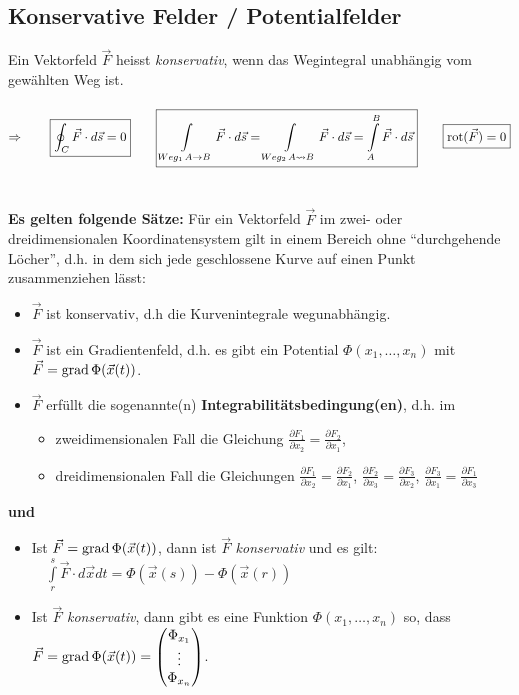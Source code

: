 \subsection{Konservative Felder / Potentialfelder}
Ein Vektorfeld $\vec{F}$ heisst \textit{konservativ}, wenn das Wegintegral
unabhängig vom gewählten Weg ist.\\\\
$\Rightarrow\qquad \boxed{\oint_C \vec{F}\cdot d\vec{s}=0}\qquad\boxed{
\int\limits_{Weg_1\, A\rightarrow B} \vec{F}\cdot d\vec{s}=\int\limits_{Weg_2\,
A\leadsto B} \vec{F}\cdot d\vec{s}=\int\limits_A^B \vec{F}\cdot
d\vec{s}}\qquad\boxed{\operatorname{rot} (\vec{F})=0}$\\\\\\	
\textbf{Es gelten folgende Sätze:}
Für ein Vektorfeld $\vec{F}$ im zwei- oder dreidimensionalen Koordinatensystem
gilt in einem Bereich ohne "`durchgehende Löcher"', d.h. in dem sich jede
geschlossene Kurve auf einen Punkt zusammenziehen lässt:
\begin{itemize}
  \item $\vec{F}$ ist konservativ, d.h die Kurvenintegrale wegunabhängig.
  \item $\vec{F}$ ist ein Gradientenfeld, d.h. es gibt ein Potential
  $\Phi(x_1,\ldots,x_n)$ mit $\vec{F}=\operatorname{grad} \Phi(\vec{x}(t))$.
  \item $\vec{F}$ erfüllt die sogenannte(n)
  \textbf{Integrabilitätsbedingung(en)}, d.h. im
  \begin{itemize}
    \item zweidimensionalen Fall die Gleichung $\frac{\partial F_1}{\partial
    x_2}=\frac{\partial F_2}{\partial x_1}$,
    \item dreidimensionalen Fall die Gleichungen $\frac{\partial F_1}{\partial
    x_2}=\frac{\partial F_2}{\partial x_1}$, $\frac{\partial F_2}{\partial
    x_3}=\frac{\partial F_3}{\partial x_2}$, $\frac{\partial F_3}{\partial
    x_1}=\frac{\partial F_1}{\partial x_3}$
  \end{itemize}
\end{itemize}
\textbf{und}
\begin{itemize}
  \item Ist $\vec{F}=\operatorname{grad} \Phi(\vec{x}(t))$, dann ist $\vec{F}$  
  \textit{konservativ} und es gilt: $\quad\int\limits_r^s \vec{F}\cdot d\vec{x}
  dt=\Phi(\vec{x}(s))-\Phi(\vec{x}(r))$
  \item Ist $\vec{F}$ \textit{konservativ}, dann gibt es eine Funktion
  $\Phi(x_1,\ldots,x_n)$ so, dass $\vec{F}=\operatorname{grad} \Phi(\vec{x}(t))=
  \begin{pmatrix}
    \Phi_{x_1}\\
    \vdots\\ 
    \Phi_{x_n}
  \end{pmatrix}$.

\end{itemize}
\newpage
